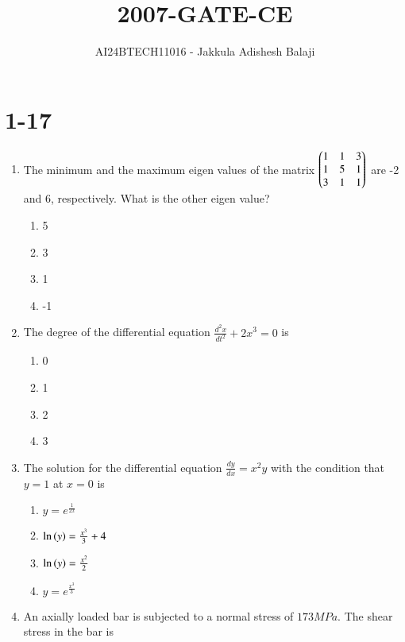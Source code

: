\documentclass[journal]{IEEEtran}
\begin{document}

\title{2007-GATE-CE}
\author{AI24BTECH11016 - Jakkula Adishesh Balaji}
{\let\newpage\relax\maketitle}

\renewcommand{\thefigure}{\theenumi}
\renewcommand{\thetable}{\theenumi}
\setlength{\intextsep}{10pt} %
\section{1-17}
\begin{enumerate}
	\item
	The minimum and the maximum eigen values of the matrix $\begin{pmatrix}1 & 1 & 3 \\ 1 & 5 & 1 \\ 3 & 1 & 1\end{pmatrix}$ are -2 and 6, respectively. What is the other eigen value?
		\begin{enumerate}
			\item 5
			\item 3
			\item 1
			\item -1
		\end{enumerate}
	\item
	The degree of the differential equation $\frac{d^{2}x}{d{t}^2} + 2x^3 = 0$ is
		\begin{enumerate}
			\item 0
			\item 1
			\item 2
			\item 3
		\end{enumerate}
	\item
	The solution for the differential equation $\frac{dy}{dx} = x^{2}y$ with the condition that $y=1$ at $x=0$ is 
		\begin{enumerate}
			\item $y=e^{\frac{1}{2x}}$
			\item $\ln\left(y\right) = \frac{x^3}{3} + 4$
			\item $\ln\left(y\right) = \frac{x^2}{2}$
			\item $y = e^{\frac{x^3}{3}}$
		\end{enumerate}
	\item
	An axially loaded bar is subjected to a normal stress of $173 MPa$. The shear stress in the bar is
		\begin{enumerate}

\end{enumerate}
\end{enumerate}
\end{document}
